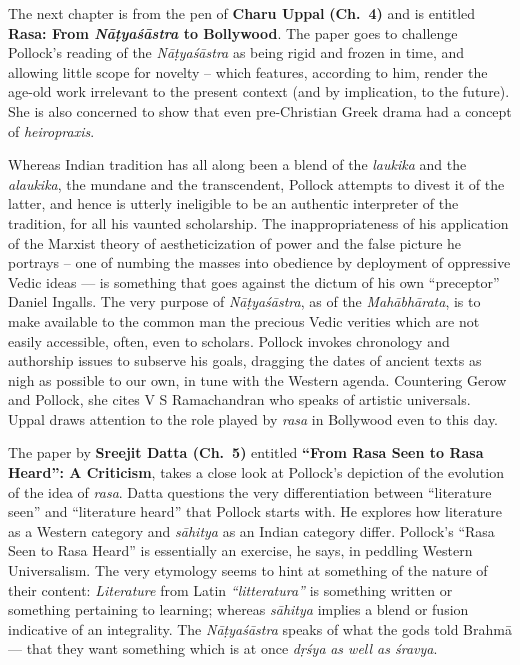 The next chapter is from the pen of {\bf Charu Uppal} {\bf(Ch.~4)} and is entitled {\bf Rasa: From \textsl{Nāṭyaśāstra} to Bollywood}. The paper goes to challenge Pollock’s reading of the \textsl{Nāṭyaśāstra} as being rigid and frozen in time, and allowing little scope for novelty -- which features, according to him, render the age-old work irrelevant to the present context (and by implication, to the future). She is also concerned to show that even pre-Christian Greek drama had a concept of \textsl{heiropraxis}.

Whereas Indian tradition has all along been a blend of the \textsl{laukika} and the \textsl{alaukika}, the mundane and the transcendent, Pollock attempts to divest it of the latter, and hence is utterly ineligible to be an authentic interpreter of the tradition, for all his vaunted scholarship. The inappropriateness of his application of the Marxist theory of aestheticization of power and the false picture he portrays -- one of numbing the masses into obedience by deployment of oppressive Vedic ideas --- is something that goes against the dictum of his own “preceptor” Daniel Ingalls. The very purpose of \textsl{Nāṭyaśāstra}, as of the \textsl{Mahābhārata}, is to make available to the common man the precious Vedic verities which are not easily accessible, often, even to scholars. Pollock invokes chronology and authorship issues to subserve his goals, dragging the dates of ancient texts as nigh as possible to our own, in tune with the Western agenda. Countering Gerow and Pollock, she cites V S Ramachandran who speaks of artistic universals. Uppal draws attention to the role played by \textsl{rasa} in Bollywood even to this day.

The paper by {\bf Sreejit Datta (Ch.~5)} entitled {\bf “From Rasa Seen to Rasa Heard”: A Criticism}, takes a close look at Pollock’s depiction of the evolution of the idea of \textsl{rasa}. Datta questions the very differentiation between “literature seen” and “literature heard” that Pollock starts with. He explores how literature as a Western category and \textsl{sāhitya} as an Indian category differ. Pollock’s “Rasa Seen to Rasa Heard” is essentially an exercise, he says, in peddling Western Universalism. The very etymology seems to hint at something of the nature of their content: \textsl{Literature} from Latin \textsl{“litteratura”} is something written or something pertaining to learning; whereas \textsl{sāhitya} implies a blend or fusion indicative of an integrality. The \textsl{Nāṭyaśāstra} speaks of what the gods told Brahmā --- that they want something which is at once \textsl{dṛśya} \textsl{as well as śravya}.

